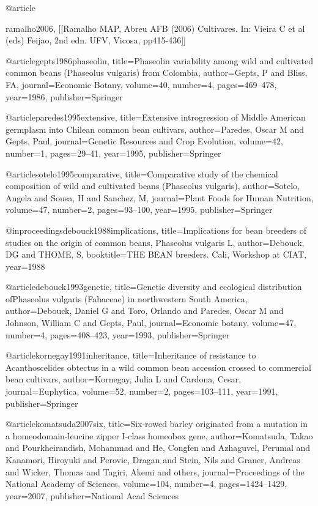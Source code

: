@article{ramalho2006,
[[Ramalho MAP, Abreu AFB (2006) Cultivares. In: Vieira C et al (eds) Feijao, 2nd edn. UFV, Vicosa, pp415-436]]

@article{gepts1986phaseolin,
  title={Phaseolin variability among wild and cultivated common beans (Phaseolus vulgaris) from Colombia},
  author={Gepts, P and Bliss, FA},
  journal={Economic Botany},
  volume={40},
  number={4},
  pages={469--478},
  year={1986},
  publisher={Springer}
}

@article{paredes1995extensive,
  title={Extensive introgression of Middle American germplasm into Chilean common bean cultivars},
  author={Paredes, Oscar M and Gepts, Paul},
  journal={Genetic Resources and Crop Evolution},
  volume={42},
  number={1},
  pages={29--41},
  year={1995},
  publisher={Springer}
}

@article{sotelo1995comparative,
  title={Comparative study of the chemical composition of wild and cultivated beans (Phaseolus vulgaris)},
  author={Sotelo, Angela and Sousa, H and Sanchez, M},
  journal={Plant Foods for Human Nutrition},
  volume={47},
  number={2},
  pages={93--100},
  year={1995},
  publisher={Springer}
}

@inproceedings{debouck1988implications,
  title={Implications for bean breeders of studies on the origin of common beans, Phaseolus vulgaris L},
  author={Debouck, DG and THOME, S},
  booktitle={THE BEAN breeders. Cali, Workshop at CIAT},
  year={1988}
}

@article{debouck1993genetic,
  title={Genetic diversity and ecological distribution ofPhaseolus vulgaris (Fabaceae) in northwestern South America},
  author={Debouck, Daniel G and Toro, Orlando and Paredes, Oscar M and Johnson, William C and Gepts, Paul},
  journal={Economic botany},
  volume={47},
  number={4},
  pages={408--423},
  year={1993},
  publisher={Springer}
}

@article{kornegay1991inheritance,
  title={Inheritance of resistance to Acanthoscelides obtectus in a wild common bean accession crossed to commercial bean cultivars},
  author={Kornegay, Julia L and Cardona, Cesar},
  journal={Euphytica},
  volume={52},
  number={2},
  pages={103--111},
  year={1991},
  publisher={Springer}
}

@article{komatsuda2007six,
  title={Six-rowed barley originated from a mutation in a homeodomain-leucine zipper I-class homeobox gene},
  author={Komatsuda, Takao and Pourkheirandish, Mohammad and He, Congfen and Azhaguvel, Perumal and Kanamori, Hiroyuki and Perovic, Dragan and Stein, Nils and Graner, Andreas and Wicker, Thomas and Tagiri, Akemi and others},
  journal={Proceedings of the National Academy of Sciences},
  volume={104},
  number={4},
  pages={1424--1429},
  year={2007},
  publisher={National Acad Sciences}
}

}
